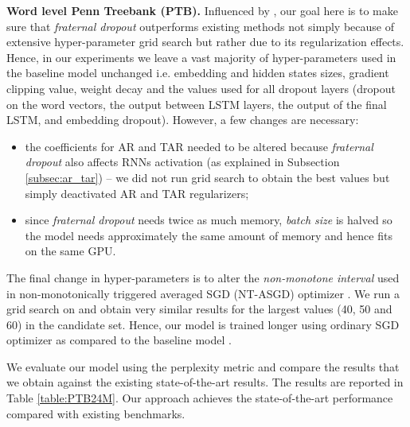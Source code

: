 \documentclass{article} \usepackage{iclr2018_conference,times}
\begin{document}
\textbf{Word level Penn Treebank (PTB).} Influenced by \cite{melis2017state}, our goal here is to make sure that \emph{fraternal dropout} outperforms existing methods not simply because of extensive hyper-parameter grid search but rather due to its regularization effects. Hence, in our experiments we leave a vast majority of hyper-parameters used in the baseline model \citep{melis2017state} unchanged i.e. embedding and hidden states sizes, gradient clipping value, weight decay and the values used for all dropout layers (dropout on the word vectors, the output between LSTM layers, the output of the final LSTM, and embedding dropout). However, a few changes are necessary:
\begin{itemize}
\item the coefficients for AR and TAR needed to be altered because \emph{fraternal dropout} also affects RNNs activation (as explained in Subsection \ref{subsec:ar_tar}) -- we did not run grid search to obtain the best values but simply deactivated AR and TAR regularizers;
\item since \emph{fraternal dropout} needs twice as much memory, \textit{batch size} is halved so the model needs approximately the same amount of memory and hence fits on the same GPU.
\end{itemize}
The final change in hyper-parameters is to alter the \emph{non-monotone interval}  used in non-monotonically triggered averaged SGD (NT-ASGD) optimizer \cite{polyak1992acceleration, mandt2017stochastic,melis2017state}. We run a grid search on  and obtain very similar results for the largest values (40, 50 and 60) in the candidate set. Hence, our model is trained longer using ordinary SGD optimizer as compared to the baseline model \citep{melis2017state}.

We evaluate our model using the perplexity metric and compare the results that we obtain against the existing state-of-the-art results. The results are reported in Table \ref{table:PTB24M}. Our approach achieves the state-of-the-art performance compared with existing benchmarks.
\end{document}
